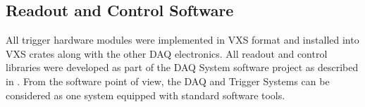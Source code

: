 \subsection{Readout and Control Software}

All trigger hardware modules were implemented in VXS format and installed into VXS crates along with the other DAQ electronics. All readout and control libraries were developed as part of the DAQ System software project as described in \cite{daq-ref}. From the software point of view, the DAQ and Trigger Systems can be considered as one system equipped with standard software tools.